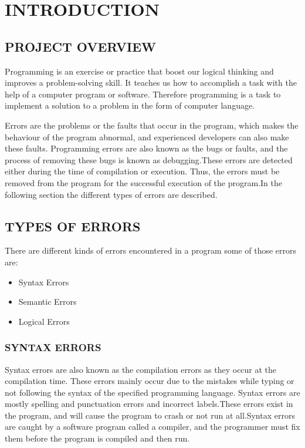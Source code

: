 
\chapter{\uppercase{Introduction}} %
\label{intro} %
\justifying
\section{\uppercase{PROJECT OVERVIEW}}
Programming is an exercise or practice that boost our logical thinking and improves a problem-solving skill. It teaches us how to accomplish a task with the help of a computer program or software. Therefore programming is a task to implement a solution to a problem in the form of computer language.

              Errors are the problems or the faults that occur in the program, which makes the behaviour of the program abnormal, and experienced developers can also make these faults. Programming errors are also known as the bugs or faults, and the process of removing these bugs is known as debugging.These errors are detected either during the time of compilation or execution. Thus, the errors must be removed from the program for the successful execution of the program.In the following section the different types of errors are described.

 
  \section{\uppercase{TYPES OF ERRORS}}

                 There are different kinds of errors encountered in a program some of those errors are:
                 \begin{itemize}
  \item Syntax Errors
  \item Semantic Errors
  \item Logical Errors
\end{itemize}
                 
\subsection{SYNTAX ERRORS}
Syntax errors are also known as the compilation errors as they occur at the compilation time.\cite{bitesize_2022} These errors mainly occur due to the mistakes while typing or not following the syntax of the specified programming language. Syntax errors are mostly spelling and punctuation errors and incorrect labels.These errors exist in the program, and will cause the program to crash or not run at all.Syntax errors are caught by a software program called a compiler, and the programmer must fix them before the program is compiled and then run.
